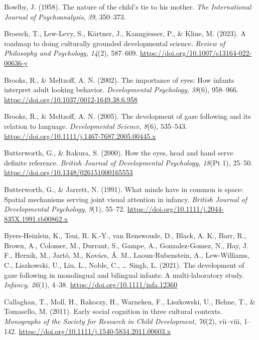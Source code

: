 \documentclass[
]{scrbook}
\newlength{\cslhangindent}
\newenvironment{CSLReferences}[2] %
 {\begin{list}{}{%
  \setlength{\itemindent}{0pt}
  \setlength{\leftmargin}{0pt}
  \setlength{\parsep}{0pt}
  \ifodd #1
   \setlength{\leftmargin}{\cslhangindent}
   \setlength{\itemindent}{-1\cslhangindent}
  \fi
  \setlength{\itemsep}{#2\baselineskip}}}
 {\end{list}}
\begin{document}
\begin{CSLReferences}{1}{0}
Bowlby, J. (1958). The nature of the child's tie to his mother. \emph{The International Journal of Psychoanalysis}, \emph{39}, 350--373.

Broesch, T., Lew-Levy, S., Kärtner, J., Kanngiesser, P., \& Kline, M. (2023). A roadmap to doing culturally grounded developmental science. \emph{Review of Philosophy and Psychology}, \emph{14}(2), 587--609. \url{https://doi.org/10.1007/s13164-022-00636-y}

Brooks, R., \& Meltzoff, A. N. (2002). The importance of eyes: {How} infants interpret adult looking behavior. \emph{Developmental Psychology}, \emph{38}(6), 958--966. \url{https://doi.org/10.1037/0012-1649.38.6.958}

Brooks, R., \& Meltzoff, A. N. (2005). The development of gaze following and its relation to language. \emph{Developmental Science}, \emph{8}(6), 535--543. \url{https://doi.org/10.1111/j.1467-7687.2005.00445.x}

Butterworth, G., \& Itakura, S. (2000). How the eyes, head and hand serve definite reference. \emph{British Journal of Developmental Psychology}, \emph{18}(Pt 1), 25--50. \url{https://doi.org/10.1348/026151000165553}

Butterworth, G., \& Jarrett, N. (1991). What minds have in common is space: {Spatial} mechanisms serving joint visual attention in infancy. \emph{British Journal of Developmental Psychology}, \emph{9}(1), 55--72. \url{https://doi.org/10.1111/j.2044-835X.1991.tb00862.x}

Byers-Heinlein, K., Tsui, R. K.-Y., van Renswoude, D., Black, A. K., Barr, R., Brown, A., Colomer, M., Durrant, S., Gampe, A., Gonzalez-Gomez, N., Hay, J. F., Hernik, M., Jartó, M., Kovács, Á. M., Laoun-Rubenstein, A., Lew-Williams, C., Liszkowski, U., Liu, L., Noble, C., \ldots{} Singh, L. (2021). The development of gaze following in monolingual and bilingual infants: {A} multi-laboratory study. \emph{Infancy}, \emph{26}(1), 4--38. \url{https://doi.org/10.1111/infa.12360}

Callaghan, T., Moll, H., Rakoczy, H., Warneken, F., Liszkowski, U., Behne, T., \& Tomasello, M. (2011). Early social cognition in three cultural contexts. \emph{Monographs of the Society for Research in Child Development}, \emph{76}(2), vii--viii, 1--142. \url{https://doi.org/10.1111/j.1540-5834.2011.00603.x}


\end{CSLReferences}
\end{document}

